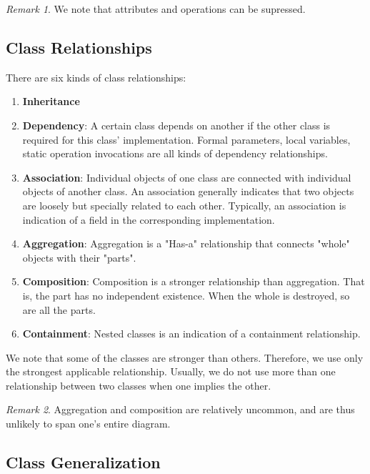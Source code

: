 \documentclass[11pt]{article}
\theoremstyle{plain} %
\theoremstyle{definition}
\theoremstyle{example}
\theoremstyle{remark}
\newtheorem*{remark}{Remark}
\begin{document}
\begin{remark}
We note that attributes and operations can be supressed.
\end{remark}

\subsection{Class Relationships}

There are six kinds of class relationships:

\begin{enumerate}
	\item \textbf{Inheritance}
	\item \textbf{Dependency}: A certain class depends on another if the other class is required for this class' implementation. Formal parameters, local variables, static operation invocations are all kinds of dependency relationships.
	\item \textbf{Association}: Individual objects of one class are connected with individual objects of another class. An association generally indicates that two objects are loosely but specially related to each other. Typically, an association is indication of a field in the corresponding implementation.
	\item \textbf{Aggregation}: Aggregation is a "Has-a" relationship that connects "whole" objects with their "parts".
	\item \textbf{Composition}: Composition is a stronger relationship than aggregation. That is, the part has no independent existence. When the whole is destroyed, so are all the parts. 
	\item \textbf{Containment}: Nested classes is an indication of a containment relationship.
\end{enumerate}

We note that some of the classes are stronger than others. Therefore, we use only the strongest applicable relationship. Usually, we do not use more than one relationship between two classes when one implies the other. 

\begin{remark}
Aggregation and composition are relatively uncommon, and are thus unlikely to span one's entire diagram.
\end{remark}

\subsection{Class Generalization}
\end{document}
